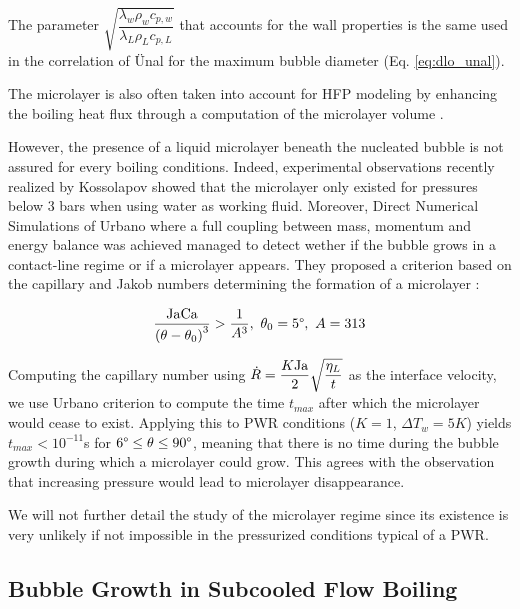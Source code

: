 \begin{remark*}{}
The parameter $ \sqrt{\dfrac{\lambda_{w}\rho_{w}c_{p,w}}{\lambda_{L}\rho_{L}c_{p,L}}}$ that accounts for the wall properties is the same used in the correlation of \"Unal for the maximum bubble diameter (Eq. \ref{eq:dlo_unal}).
\end{remark*}

The microlayer is also often taken into account for HFP modeling by enhancing the boiling heat flux through a computation of the microlayer volume \cite{kommajosyula_development_2020, demarly_new_2020}. 

\npar

However, the presence of a liquid microlayer beneath the nucleated bubble is not assured for every boiling conditions. Indeed, experimental observations recently realized by Kossolapov \cite{kossolapov_experimental_2021} showed that the microlayer only existed for pressures below 3 bars when using water as working fluid. Moreover, Direct Numerical Simulations of Urbano \etal \cite{urbano_direct_2018} where a full coupling between mass, momentum and energy balance was achieved managed to detect wether if the bubble grows in a contact-line regime or if a microlayer appears. They proposed a criterion based on the capillary and Jakob numbers determining the formation of a microlayer :

\begin{equation}
\frac{\Ja \Ca}{\parth{\theta-\theta_{0}}^{3}} > \frac{1}{A^{3}},\ \theta_{0}=5\degree,\ A=313
\end{equation}

\begin{remark*}{}
Computing the capillary number using $\dot{R}=\dfrac{K\mathrm{Ja}}{2}\sqrt{\dfrac{\eta_{L}}{t}}$ as the interface velocity, we use Urbano \etal criterion to compute the time $t_{max}$ after which the microlayer would cease to exist. Applying this to PWR conditions ($K=1$, $\Delta T_{w}=5K$) yields $t_{max}<10^{-11}$s for $6\degree \leq \theta \leq 90\degree$, meaning that there is no time during the bubble growth during which a microlayer could grow. This agrees with the observation that increasing pressure would lead to microlayer disappearance.
\end{remark*}

We will not further detail the study of the microlayer regime since its existence is very unlikely if not impossible in the pressurized conditions typical of a PWR.


\subsection{Bubble Growth in Subcooled Flow Boiling}


